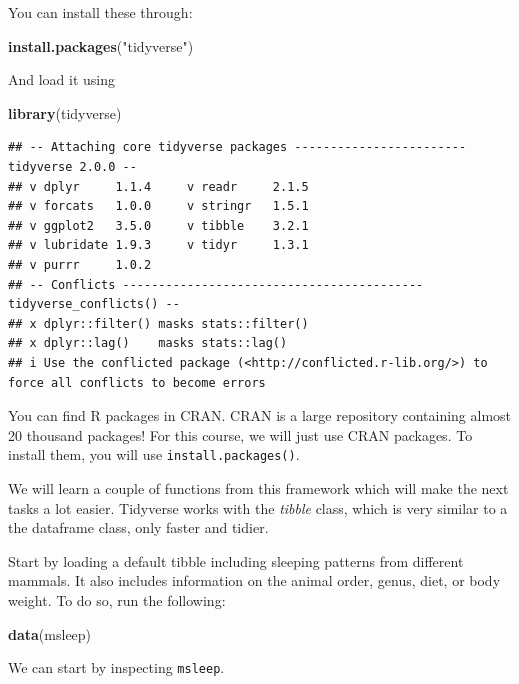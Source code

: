 \documentclass[
]{book}
\newenvironment{Shaded}{\begin{snugshade}}{\end{snugshade}}
\newcommand{\FunctionTok}[1]{\textcolor[rgb]{0.13,0.29,0.53}{\textbf{#1}}}
\newcommand{\NormalTok}[1]{#1}
\newcommand{\StringTok}[1]{\textcolor[rgb]{0.31,0.60,0.02}{#1}}
\begin{document}
You can install these through:

\begin{Shaded}
\begin{Highlighting}[]
\FunctionTok{install.packages}\NormalTok{(}\StringTok{"tidyverse"}\NormalTok{)}
\end{Highlighting}
\end{Shaded}

And load it using

\begin{Shaded}
\begin{Highlighting}[]
\FunctionTok{library}\NormalTok{(tidyverse)}
\end{Highlighting}
\end{Shaded}

\begin{verbatim}
## -- Attaching core tidyverse packages ------------------------ tidyverse 2.0.0 --
## v dplyr     1.1.4     v readr     2.1.5
## v forcats   1.0.0     v stringr   1.5.1
## v ggplot2   3.5.0     v tibble    3.2.1
## v lubridate 1.9.3     v tidyr     1.3.1
## v purrr     1.0.2     
## -- Conflicts ------------------------------------------ tidyverse_conflicts() --
## x dplyr::filter() masks stats::filter()
## x dplyr::lag()    masks stats::lag()
## i Use the conflicted package (<http://conflicted.r-lib.org/>) to force all conflicts to become errors
\end{verbatim}

You can find R packages in CRAN.
CRAN is a large repository containing almost 20 thousand packages!
For this course, we will just use CRAN packages.
To install them, you will use \texttt{install.packages()}.

We will learn a couple of functions from this framework which will make the next tasks a lot easier.
Tidyverse works with the \emph{tibble} class, which is very similar to a the dataframe class, only faster and tidier.

Start by loading a default tibble including sleeping patterns from different mammals.
It also includes information on the animal order, genus, diet, or body weight.
To do so, run the following:

\begin{Shaded}
\begin{Highlighting}[]
\FunctionTok{data}\NormalTok{(msleep)}
\end{Highlighting}
\end{Shaded}

We can start by inspecting \texttt{msleep}.
\end{document}
